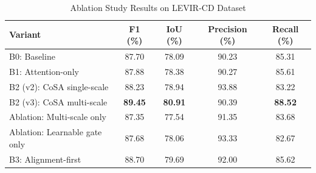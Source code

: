 \begin{table}[h]
\centering
\caption{Ablation Study Results on LEVIR-CD Dataset}
\label{tab:ablation}
\begin{tabular}{lcccc}
\toprule
\textbf{Variant} & \textbf{F1 (\%)} & \textbf{IoU (\%)} & \textbf{Precision (\%)} & \textbf{Recall (\%)} \\
\midrule
B0: Baseline & 87.70 & 78.09 & 90.23 & 85.31 \\
B1: Attention-only & 87.88 & 78.38 & 90.27 & 85.61 \\
B2 (v2): CoSA single-scale & 88.23 & 78.94 & 93.88 & 83.22 \\
B2 (v3): CoSA multi-scale & \textbf{89.45} & \textbf{80.91} & 90.39 & \textbf{88.52} \\
Ablation: Multi-scale only & 87.35 & 77.54 & 91.35 & 83.68 \\
Ablation: Learnable gate only & 87.68 & 78.06 & 93.33 & 82.67 \\
B3: Alignment-first & 88.70 & 79.69 & 92.00 & 85.62 \\
\bottomrule
\end{tabular}
\end{table}
